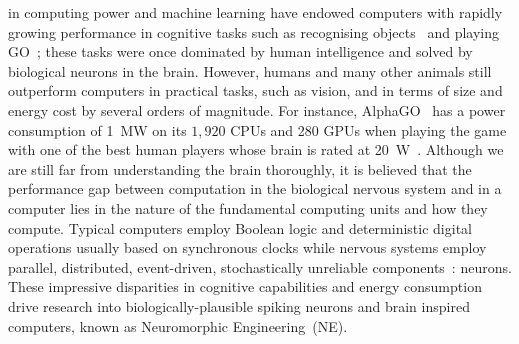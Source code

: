 \documentclass[10pt,journal,compsoc]{IEEEtran}
\begin{document}
% 
% 
% 
% 
 in computing power and machine learning have endowed computers with rapidly growing performance in cognitive tasks such as recognising objects~\cite{deng2009imagenet} and playing GO~\cite{silver2016mastering};
these tasks were once dominated by human intelligence and solved by biological neurons in the brain.
However, humans and many other animals still outperform computers in practical tasks, such as vision, and in terms of size and energy cost by several orders of magnitude.
For instance, AlphaGO~\cite{silver2016mastering} has a power consumption of 1~MW on its $1,920$ CPUs and 280 GPUs when playing the game with one of the best human players whose brain is rated at 20~W~\cite{drubach2000brain}.
Although we are still far from understanding the brain thoroughly, it is believed that the performance gap between computation in the biological nervous system and in a computer lies in the nature of the fundamental computing units and how they compute.
Typical computers employ Boolean logic and deterministic digital operations usually based on synchronous clocks while nervous systems employ parallel, distributed, event-driven, stochastically unreliable components~\cite{indiveri2009artificial}: neurons.
These impressive disparities in cognitive capabilities and energy consumption drive research into biologically-plausible spiking neurons and brain inspired computers, known as Neuromorphic Engineering~(NE).
\end{document}
